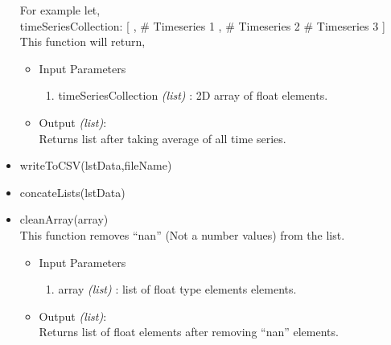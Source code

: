 \begin{itemize}
	For example let,\\
	timeSeriesCollection: [ \newline
	    [1,2,3], \# Timeseries 1 \newline
	    [4,5,6], \# Timeseries 2 \newline
	    [7,8,9] \# Timeseries 3 \newline
	] \newline
	\\
	This function will return,\newline
	[4,5,6] \newline
	
	\begin{itemize}
	  \item Input Parameters
	  
	  \begin{enumerate}
	    \item timeSeriesCollection \textit{(list)} : 2D array of float 
elements.
	  \end{enumerate}

	  \item Output \textit{(list)}: \\
	  Returns list after taking average of all time series.
	  
	\end{itemize}
 
 
 
 \item writeToCSV(lstData,fileName) \\
 \item concateLists(lstData) \\
 \item cleanArray(array) \\
 
	This function removes ``nan'' (Not a number values) from the list.
	
	\begin{itemize}
	  \item Input Parameters
	  
	  \begin{enumerate}
	    \item array \textit{(list)} : list of float type elements
elements.
	  \end{enumerate}

	  \item Output \textit{(list)}: \\
	  Returns list of float elements after removing ``nan'' elements.
	  

\end{itemize}
\end{itemize}
